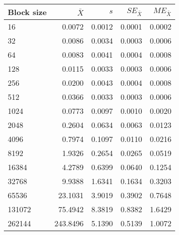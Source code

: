 \begin{tabular}{lrrrr}\toprule
{\small Block size} & $\bar{X}$ & $s$ & $SE_{\bar{X}}$ & $ME_{\bar{X}}$ \\\midrule
16 & 0.0072 & 0.0012 & 0.0001 & 0.0002\\
32 & 0.0086 & 0.0034 & 0.0003 & 0.0006\\
64 & 0.0083 & 0.0041 & 0.0004 & 0.0008\\
128 & 0.0115 & 0.0033 & 0.0003 & 0.0006\\
256 & 0.0200 & 0.0043 & 0.0004 & 0.0008\\
512 & 0.0366 & 0.0033 & 0.0003 & 0.0006\\
1024 & 0.0773 & 0.0097 & 0.0010 & 0.0020\\
2048 & 0.2604 & 0.0634 & 0.0063 & 0.0123\\
4096 & 0.7974 & 0.1097 & 0.0110 & 0.0216\\
8192 & 1.9326 & 0.2654 & 0.0265 & 0.0519\\
16384 & 4.2789 & 0.6399 & 0.0640 & 0.1254\\
32768 & 9.9388 & 1.6341 & 0.1634 & 0.3203\\
65536 & 23.1031 & 3.9019 & 0.3902 & 0.7648\\
131072 & 75.4942 & 8.3819 & 0.8382 & 1.6429\\
262144 & 243.8496 & 5.1390 & 0.5139 & 1.0072\\
\bottomrule
\end{tabular}
